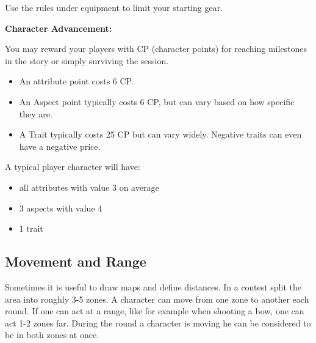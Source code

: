\documentclass[11pt]{article}
\begin{document}
{\begin{short}
Use the rules under equipment to limit your starting gear.

\textbf{Character Advancement:}

You may reward your players with CP (character points) for reaching milestones in the story or simply surviving the session.

\begin{itemize}
\item An attribute point costs 6 CP.
\item An Aspect point typically costs 6 CP, but can vary based on how specific they are.
\item A Trait typically costs 25 CP but can vary widely. Negative traits can even have a negative price.
\end{itemize}

A typical player character will have:
\begin{itemize}
\item all attributes with value 3 on average
\item 3 aspects with value 4
\item 1 trait
\end{itemize}
\end{short}
\subsection{Movement and Range}
\label{sec:org8937495}
\begin{short}
Sometimes it is useful to draw maps and define distances. In a contest split the area into roughly 3-5 zones. A character can move from one zone to another each round. If one can act at a range, like for example when shooting a bow, one can act 1-2 zones far. During the round a character is moving he can be considered to be in both zones at once.
\end{short}
}
\end{document}
